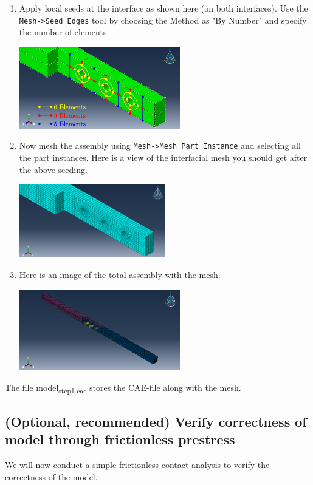 \documentclass[11pt]{article}
\begin{document}
\begin{enumerate}
\begin{center}
\end{center}
\item Apply local seeds at the interface as shown here (on both interfaces).
Use the \texttt{Mesh->Seed Edges} tool by choosing the Method as "By Number" and specify the number of elements.
\begin{center}
\includegraphics[width=0.55\textwidth]{./figs/lmeshseeds.png}
\end{center}
\item Now mesh the assembly using \texttt{Mesh->Mesh Part Instance} and selecting all the part instances.
Here is a view of the interfacial mesh you should get after the above seeding.
\begin{center}
\includegraphics[width=0.5\textwidth]{./figs/mesh.png}
\end{center}
\item Here is an image of the total assembly with the mesh.
\begin{center}
\includegraphics[width=0.55\textwidth]{./figs/fullmesh.png}
\end{center}
\end{enumerate}

The file \href{https://github.com/Nidish96/Abaqus4Joints/blob/main/assets/assembly/model\_step1.cae}{model\textsubscript{step1.cae}} stores the CAE-file along with the mesh.
\subsection{(Optional, recommended) Verify correctness of model through frictionless prestress}
\label{sec:org2b30b18}
We will now conduct a simple frictionless contact analysis to verify the correctness of the model.
\end{document}
